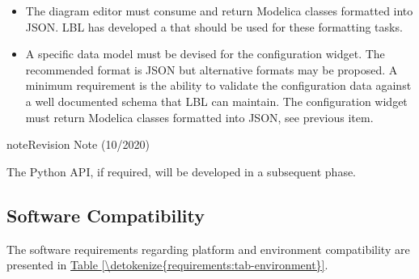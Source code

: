 \documentclass[letterpaper,10pt, openany,english]{sphinxmanual}
\begin{document}
\begin{itemize}
\begin{itemize}
\begin{itemize}
\item {} 
For the second development phase, the primary integration target is  (OS) while the widget to be integrated is now the full\sphinxhyphen{}featured editor (including the configuration widget).
An example of a JS application embedded in OS is . The standalone SPA lives here: . FloorspaceJS may be considered as a reference for the development.

\end{itemize}

\end{itemize}

\item {} 
The diagram editor must consume and return Modelica classes formatted into JSON. LBL has developed a  that should be used for these formatting tasks.

\item {} 
A specific data model must be devised for the configuration widget. The recommended format is JSON but alternative formats may be proposed. A minimum requirement is the ability to validate the configuration data against a well documented schema that LBL can maintain. The configuration widget must return Modelica classes formatted into JSON, see previous item.

\end{itemize}

\begin{sphinxadmonition}{note}{Revision Note (10/2020)}

The Python API, if required, will be developed in a subsequent phase.
\end{sphinxadmonition}


\subsection{Software Compatibility}
\label{\detokenize{requirements:software-compatibility}}
The software requirements regarding platform and environment compatibility are presented in \hyperref[\detokenize{requirements:tab-environment}]{Table \ref{\detokenize{requirements:tab-environment}}}.
\end{document}
